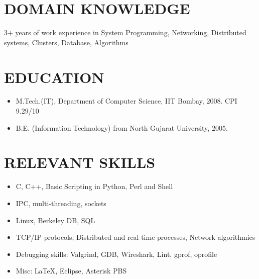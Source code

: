 \documentclass{res}
\begin{document}
\begin{resume}

					 \section{DOMAIN KNOWLEDGE}

					 3+ years of work experience in System Programming, Networking, Distributed systems, Clusters, Database, Algorithms 
					  
					  \section{EDUCATION}
					  \begin{itemize}
					  \item M.Tech.(IT), Department of Computer Science, IIT Bombay, 2008. CPI 9.29/10 
					  \item B.E. (Information Technology) from North Gujarat University, 2005. 
					  \end{itemize}

					  \section{RELEVANT SKILLS}

					  \begin{itemize}
					  \item C, C++, Basic Scripting in Python, Perl and Shell 
					  \item IPC, multi-threading, sockets
					  \item Linux, Berkeley DB, SQL
					  \item TCP/IP protocols, Distributed and real-time processes, Network algorithmics
				          \item Debugging skills: Valgrind, GDB, Wireshark, Lint, gprof, oprofile 
					  \item Misc: \LaTeX, Eclipse, Asterisk PBS
					  \end{itemize}


\end{resume}
\end{document}

